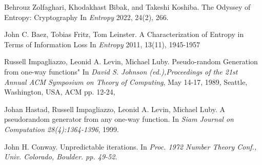 \documentclass[preprint]{sigplanconf}
\begin{document}
\begin{thebibliography}{9}
    Behrouz Zolfaghari, Khodakhast Bibak, and Takeshi Koshiba.
    \newblock The Odyssey of Entropy: Cryptography
    \newblock In \emph{Entropy} 2022, 24(2), 266.

    John C. Baez, Tobias Fritz, Tom Leinster.
    \newblock A Characterization of Entropy in Terms of Information Loss
    \newblock In \emph{Entropy} 2011, 13(11), 1945-1957

    Russell Impagliazzo, Leonid A. Levin, Michael Luby.
    \newblock Pseudo-random Generation from one-way functions"
    \newblock In \emph{David S. Johnson (ed.),Proceedings of the 21st Annual ACM Symposium on Theory of Computing}, May 14-17, 1989, Seattle, Washington, USA, {ACM} pp. 12-24,

    Johan Hastad, Russell Impagliazzo, Leonid A. Levin, Michael Luby.
    \newblock A pseudorandom generator from any one-way function. 
    \newblock In \emph{Siam Journal on Computation 28(4):1364-1396}, 1999.

    John H. Conway.
    \newblock Unpredictable iterations.  
    \newblock In \emph{Proc. 1972 Number Theory Conf., Univ. Colorado, Boulder. pp. 49-52.}

\end{thebibliography}
\end{document}
